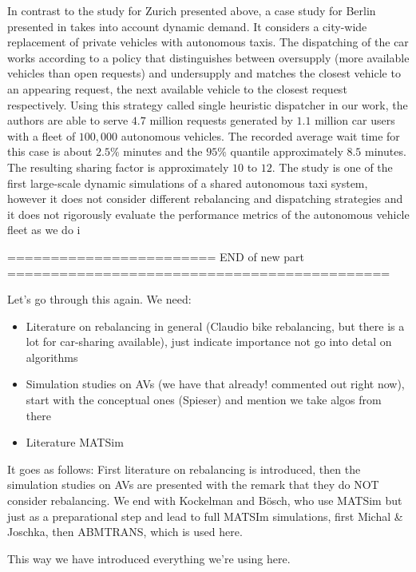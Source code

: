 In contrast to the study for Zurich presented above, a case study for Berlin presented in \cite{bischoff2016simulation} takes into account dynamic demand. It considers a city-wide replacement of private vehicles with autonomous taxis. The dispatching of the car works according to a policy that distinguishes between oversupply (more available vehicles than open requests) and undersupply and matches the closest vehicle to an appearing request, the next available vehicle to the closest request respectively. Using this strategy called single heuristic dispatcher in our work, the authors are able to serve $4.7$ million requests generated by $1.1$ million car users with a fleet of $100,000$ autonomous vehicles. The recorded average wait time for this case is about $2.5 \%$ minutes and the $95\%$ quantile approximately $8.5$ minutes. The resulting sharing factor is approximately $10$ to $12$. The study is one of the first large-scale dynamic simulations of a shared autonomous taxi system, however it does not consider different rebalancing and dispatching strategies and it does not rigorously evaluate the performance metrics of the autonomous vehicle fleet as we do i






























======================== END of new part ============================================

Let's go through this again. We need:

\begin{itemize}
\item Literature on rebalancing in general (Claudio bike rebalancing, but there is a lot for car-sharing available), just indicate importance not go into detal on algorithms
\item Simulation studies on AVs (we have that already! commented out right now), start with the conceptual ones (Spieser) and mention we take algos from there
\item Literature MATSim
\end{itemize}

It goes as follows: First literature on rebalancing is introduced, then the simulation studies on AVs
are presented with the remark that they do NOT consider rebalancing. We end with Kockelman and Bösch,
who use MATSim but just as a preparational step and lead to full MATSIm simulations, first Michal & Joschka,
then ABMTRANS, which is used here.

This way we have introduced everything we're using here.



